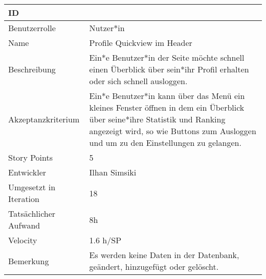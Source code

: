 \begin{tabularx}{\textwidth}{|p{}|X|}
	\hline
	ID & \\
	\hline
	Benutzerrolle & Nutzer*in\\
	\hline
	Name & Profile Quickview im Header\\
	\hline
	Beschreibung & Ein*e Benutzer*in der Seite möchte schnell einen Überblick über sein*ihr Profil erhalten oder sich schnell ausloggen.\\
	\hline
	Akzeptanzkriterium & Ein*e Benutzer*in kann über das Menü ein kleines Fenster öffnen in dem ein Überblick über seine*ihre Statistik und Ranking angezeigt wird, so wie Buttons zum Ausloggen und um zu den Einstellungen zu gelangen.\\
	\hline
	Story Points & 5\\
	\hline
	Entwickler & Ilhan Simsiki\\
	\hline
	Umgesetzt in Iteration & 18\\
	\hline
	Tatsächlicher Aufwand & 8h\\
	\hline
	Velocity & 1.6 h/SP \\
	\hline
	Bemerkung & Es werden keine Daten in der Datenbank, geändert, hinzugefügt oder gelöscht.\\
	\hline
\end{tabularx}
\vspace{20pt}
